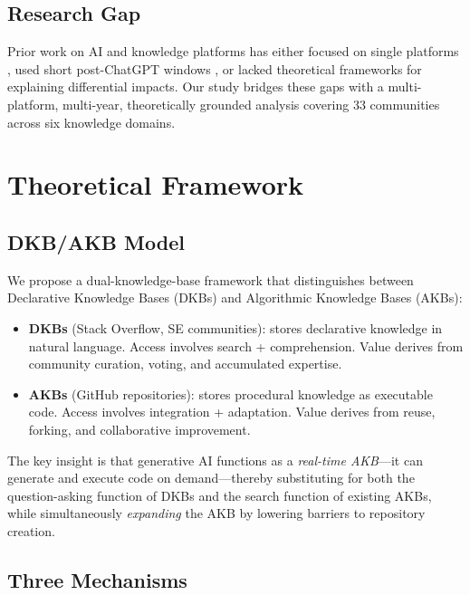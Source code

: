 \documentclass[11pt,a4paper]{article}
\begin{document}
\subsection{Research Gap}

Prior work on AI and knowledge platforms has either focused on single platforms \citep{deng2024}, used short post-ChatGPT windows \citep{li2023}, or lacked theoretical frameworks for explaining differential impacts. Our study bridges these gaps with a multi-platform, multi-year, theoretically grounded analysis covering 33 communities across six knowledge domains.

\section{Theoretical Framework}
\label{sec:theory}

\subsection{DKB/AKB Model}

We propose a dual-knowledge-base framework that distinguishes between Declarative Knowledge Bases (DKBs) and Algorithmic Knowledge Bases (AKBs):

\begin{itemize}
\item \textbf{DKBs} (Stack Overflow, SE communities): stores declarative knowledge in natural language. Access involves search + comprehension. Value derives from community curation, voting, and accumulated expertise.

\item \textbf{AKBs} (GitHub repositories): stores procedural knowledge as executable code. Access involves integration + adaptation. Value derives from reuse, forking, and collaborative improvement.
\end{itemize}

The key insight is that generative AI functions as a \textit{real-time AKB}---it can generate and execute code on demand---thereby substituting for both the question-asking function of DKBs and the search function of existing AKBs, while simultaneously \textit{expanding} the AKB by lowering barriers to repository creation.

\subsection{Three Mechanisms}
\end{document}
